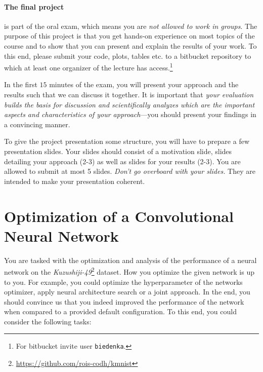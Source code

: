 \documentclass[10pt,a4paper]{article}
\begin{document}
	\paragraph{The final project} is part of the oral exam, which means you are \textit{not allowed to work in groups}.
	The purpose of this project is that you get hands-on experience on most topics of the course and to show that you can present and explain the results of your work. 
	To this end, please submit your code, plots, tables etc. to a bitbucket repository to which at least one organizer of the lecture has access.\footnote{
	For bitbucket invite user \texttt{biedenka}.}

	In the first $15$ minutes of the exam, you will present your approach and the results such that we can discuss it together.
	It is important that \textit{your evaluation builds the basis for discussion and scientifically analyzes which are the important aspects and characteristics of your approach}---you should present your findings in a convincing manner.
	
	To give the project presentation some structure, you will have to prepare a few presentation slides.
	Your slides should consist of a motivation slide, slides detailing your approach (2-3) as well as slides for your results (2-3).
	You are allowed to submit at most 5 slides.
	\textit{Don't go overboard with your slides.}
	They are intended to make your presentation coherent.
	
	\section*{Optimization of a Convolutional Neural Network}
		
		You are tasked with the optimization and analysis of the performance of a neural network on the \emph{Kuzushiji-49}\footnote{\url{https://github.com/rois-codh/kmnist}} dataset.
		How you optimize the given network is up to you. 
		For example, you could optimize the hyperparameter of the networks optimizer, apply neural architecture search or a joint approach.
		In the end, you should convince us that you indeed improved the performance of the network when compared to a provided default configuration.
		To this end, you could consider the following tasks:
		
\end{document}
